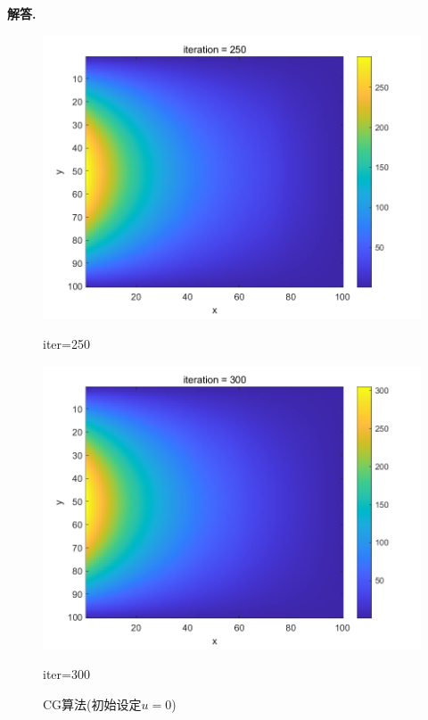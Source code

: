 \documentclass[12pt, a4paper, oneside, UTF8]{ctexart}
\newenvironment{solution}{\par\noindent\textbf{解答. }}{\par}
\begin{document}
\begin{solution}
\begin{figure}[h]
\begin{minipage}[b]{0.3\textwidth}
            \includegraphics[width=\textwidth]{Problem3_5.png}
            \caption{iter=250}
        \end{minipage}
        \begin{minipage}[b]{0.3\textwidth}
            \centering
            \includegraphics[width=\textwidth]{Problem3_6.png}
            \caption{iter=300}
        \end{minipage}
        \captionsetup{labelformat=empty}  %
        \caption{CG算法(初始设定$u=0$)}  %
    \end{figure}
    \begin{figure}[htbp]
        \centering

\end{figure}
\end{solution}
\end{document}
